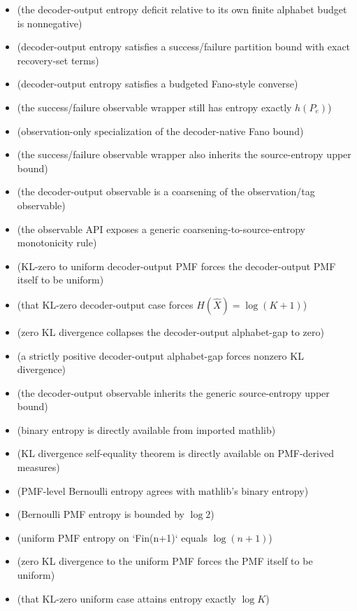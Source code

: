 \begin{itemize}
\item {} (the decoder-output entropy deficit relative to its own finite alphabet budget is nonnegative)
\item {} (decoder-output entropy satisfies a success/failure partition bound with exact recovery-set terms)
\item {} (decoder-output entropy satisfies a budgeted Fano-style converse)
\item {} (the success/failure observable wrapper still has entropy exactly $h(P_e)$)
\item {} (observation-only specialization of the decoder-native Fano bound)
\item {} (the success/failure observable wrapper also inherits the source-entropy upper bound)
\item {} (the decoder-output observable is a coarsening of the observation/tag observable)
\item {} (the observable API exposes a generic coarsening-to-source-entropy monotonicity rule)
\item {} (KL-zero to uniform decoder-output PMF forces the decoder-output PMF itself to be uniform)
\item {} (that KL-zero decoder-output case forces $H(\hat X)=\log(K+1)$)
\item {} (zero KL divergence collapses the decoder-output alphabet-gap to zero)
\item {} (a strictly positive decoder-output alphabet-gap forces nonzero KL divergence)
\item {} (the decoder-output observable inherits the generic source-entropy upper bound)
\item {} (binary entropy is directly available from imported mathlib)
\item {} (KL divergence self-equality theorem is directly available on PMF-derived measures)
\item {} (PMF-level Bernoulli entropy agrees with mathlib's binary entropy)
\item {} (Bernoulli PMF entropy is bounded by $\log 2$)
\item {} (uniform PMF entropy on `Fin(n+1)` equals $\log(n+1)$)
\item {} (zero KL divergence to the uniform PMF forces the PMF itself to be uniform)
\item {} (that KL-zero uniform case attains entropy exactly $\log K$)

\end{itemize}
